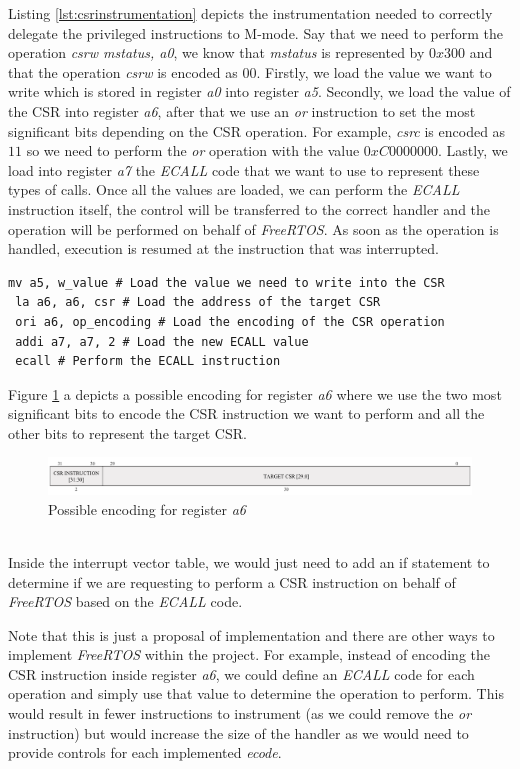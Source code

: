 Listing \ref{lst:csrinstrumentation} depicts the instrumentation needed to
correctly delegate the privileged instructions to M-mode. Say that we need to perform
the operation \textit{csrw mstatus, a0}, we know that \textit{mstatus} is
represented by $0x300$ and that the operation \textit{csrw} is encoded as $00$.
Firstly, we load the value we want to write which is stored in register \textit{a0}
into register \textit{a5}. Secondly, we load the value of the CSR into register \textit{a6},
after that we use an \textit{or} instruction to set the most significant bits
depending on the CSR operation. For example, \textit{csrc} is encoded as $11$ so
we need to perform the \textit{or} operation with the value $0xC0000000$. Lastly,
we load into register \textit{a7} the \textit{ECALL} code that we want to use to
represent these types of calls. Once all the values are loaded, we can perform
the \textit{ECALL} instruction itself, the control will be transferred to the
correct handler and the operation will be performed on behalf of \textit{FreeRTOS}.
As soon as the operation is handled, execution is resumed at the instruction that
was interrupted. \\
\begin{lstlisting}[style=Assembly, caption = \textit{FreeRTOS} instrumentation for Control and Status Register operations, label={lst:csrinstrumentation}]
 mv a5, w_value # Load the value we need to write into the CSR
 la a6, a6, csr # Load the address of the target CSR
 ori a6, op_encoding # Load the encoding of the CSR operation
 addi a7, a7, 2 # Load the new ECALL value
 ecall # Perform the ECALL instruction
\end{lstlisting}

Figure \ref{fig:a6encoding} a depicts a possible encoding for register \textit{a6}
where we use the two most significant bits to encode the CSR instruction we want
to perform and all the other bits to represent the target CSR. \\
\begin{figure}[htbp]
  \centering
  \includegraphics[width=.9\linewidth]{images/freertos_encoding.png}
  \caption{Possible encoding for register \textit{a6}}
  \label{fig:a6encoding}
\end{figure}\\

Inside the interrupt vector table, we would just need to add an if statement to
determine if we are requesting to perform a CSR instruction on behalf of \textit{FreeRTOS}
based on the \textit{ECALL} code.

Note that this is just a proposal of implementation and there are other ways to
implement \textit{FreeRTOS} within the project. For example, instead of encoding
the CSR instruction inside register \textit{a6}, we could define an \textit{ECALL}
code for each operation and simply use that value to determine the operation to
perform. This would result in fewer instructions to instrument (as we could
remove the \textit{or} instruction) but would increase the size of the handler
as we would need to provide controls for each implemented \textit{ecode}.
